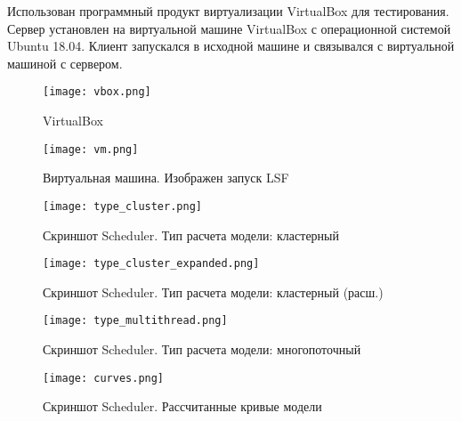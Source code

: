 Использован программный продукт виртуализации VirtualBox для тестирования. Сервер установлен на виртуальной машине VirtualBox с операционной системой Ubuntu 18.04. Клиент запускался в исходной машине и связывался с виртуальной машиной с сервером.

\begin{figure}[h]
    \centering
    \texttt{[image: vbox.png]}
    \caption{VirtualBox}
\end{figure}

\begin{figure}[h]
    \centering
    \texttt{[image: vm.png]}
    \caption{Виртуальная машина. Изображен запуск LSF}
\end{figure}

\begin{figure}[h]
    \centering
    \texttt{[image: type\_cluster.png]}
    \caption{Скриншот Scheduler. Тип расчета модели: кластерный}
\end{figure}

\begin{figure}[h]
    \centering
    \texttt{[image: type\_cluster\_expanded.png]}
    \caption{Скриншот Scheduler. Тип расчета модели: кластерный (расш.)}
\end{figure}

\begin{figure}[h]
    \centering
    \texttt{[image: type\_multithread.png]}
    \caption{Скриншот Scheduler. Тип расчета модели: многопоточный}
\end{figure}

\begin{figure}[h]
    \centering
    \texttt{[image: curves.png]}
    \caption{Скриншот Scheduler. Рассчитанные кривые модели}
\end{figure}

\clearpage